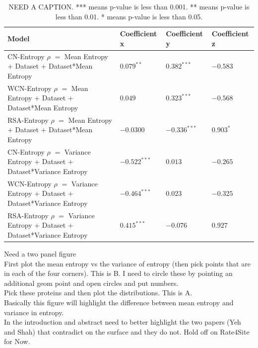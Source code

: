 \documentclass[12pt]{article}
\begin{document}
\begin{center}
	\begin{table}[H]
	\begin{tabular}{ | p{5.0cm} | p{3cm} | p{3cm} | p{3cm} | }
	\hline
	Model & Coefficient x  & Coefficient y & Coefficient z \\	
	\hline
	CN-Entropy $\rho$ $ = $ Mean Entropy + Dataset + Dataset*Mean Entropy & $0.079 ^{**}$ & $0.382^{***}$  & $-0.583$ \\	
	\hline
	WCN-Entropy $\rho$ $ = $ Mean Entropy + Dataset + Dataset*Mean Entropy & $0.049$ & $0.323^{***}$ & $-0.568$  \\	
	\hline
	RSA-Entropy $\rho$ $ = $ Mean Entropy + Dataset + Dataset*Mean Entropy &  $-0.0300$ & $-0.336^{***}$ & $0.903^{*}$ \\	

	\hline
	CN-Entropy $\rho$ $ = $ Variance Entropy + Dataset + Dataset*Variance Entropy & $-0.522^{***}$ &  $0.013$ & $-0.265$ \\	
	\hline
	WCN-Entropy $\rho$ $ = $ Variance Entropy + Dataset + Dataset*Variance Entropy & $-0.464^{***}$ &  $0.023$ & $-0.325$ \\	
	\hline
	RSA-Entropy $\rho$ $ = $ Variance Entropy + Dataset + Dataset*Variance Entropy & $0.415^{***}$ & $-0.076$ & $0.927$ \\	


	\hline
	\end{tabular}
	\caption{NEED A CAPTION. *** means p-value is less than 0.001. ** means p-value is less than 0.01.  * means p-value is less than 0.05. }
	\label{table:rate_stats}
	\end{table}
\end{center}





Need a two panel figure \\
First plot the mean entropy vs the variance of entropy (then pick points that are in each of the four corners). This is B. I need to circle these by pointing an additional geom point and open circles and put numbers.  \\
Pick these proteins and then plot the distributions. This is A. \\
Basically this figure will highlight the difference between mean entropy and variance in entropy. \\ 

In the introduction and abstract need to better highlight the two papers (Yeh and Shah) that contradict on the surface and they do not. Hold off on Rate4Site for Now.
\end{document}
